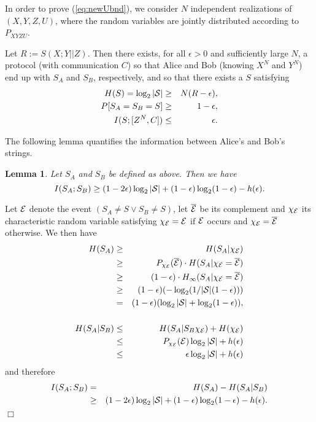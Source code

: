\documentclass[a4paper, twoside, openany]{report}
\newcommand{\eps}{\epsilon}
\newcommand{\ev}{{\cal E}}
\newcommand{\ol}[1]{\overline{#1}}
\theoremstyle{plain}
\newtheorem{lemma}[theorem]{Lemma}
\theoremstyle{definition}
\newcommand{\proofend}{\hspace*{\fill} $\Box$\\}
\begin{document}
In order to prove (\ref{eq:newUbnd}), we consider $N$ independent realizations of $(X,Y,Z,U)$, where the random variables are jointly distributed according to $P_{XYZU}$.

Let $R := S(X;Y||Z)$. Then there exists, for all $\eps > 0$ and sufficiently large $N$, a protocol (with communication $C$) so that Alice and Bob (knowing $X^N$ and $Y^N$) end up with $S_A$ and $S_B$, respectively, and so that there exists a $S$ satisfying
\begin{eqnarray}
H(S) = \log_2|{\cal S}| & \geq & N(R - \eps), \label{rate} \\
P[S_A = S_B = S]        & \geq & 1 - \eps,    \label{identical} \\
I(S;[Z^N,C])            & \leq & \eps.        \label{secret}
\end{eqnarray}

\noindent
The following lemma quantifies the information between Alice's and Bob's strings.

\begin{lemma} \label{iSASB}
Let $S_A$ and $S_B$ be defined as above. Then we have
\[I(S_A;S_B) \geq (1 - 2\eps)\log_2|{\cal S}| + (1 - \eps)\log_2(1 - \eps) - h(\eps).\]
\end{lemma}

\proof
Let $\ev$ denote the event $(S_A \neq S \lor S_B \neq S)$, let $\ol{\ev}$ be its complement and $\chi_{\ev}$ its characteristic random variable satisfying $\chi_{\ev} = \ev$ if $\ev$ occurs and $\chi_{\ev} = \ol{\ev}$ otherwise. We then have
\begin{eqnarray*}
H(S_A) & \geq & H(S_A|\chi_{\ev}) \\
       & \geq & P_{\chi_{\ev}}(\ol{\ev}) \cdot H(S_A|\chi_{\ev} = \ol{\ev}) \\
       & \geq & (1 - \eps) \cdot H_\infty(S_A|\chi_{\ev} = \ol{\ev}) \\
       & \geq & (1 - \eps)(-\log_2(1/|{\cal S}|(1 - \eps))) \\
       &   =  & (1 - \eps)(\log_2|{\cal S}| + \log_2(1 - \eps)), \\ \\
H(S_A|S_B) & \leq & H(S_A|S_B\chi_{\ev}) + H(\chi_{\ev}) \\
           & \leq & P_{\chi_{\ev}}(\ev)\log_2|{\cal S}| + h(\eps) \\
           & \leq & \eps\log_2|{\cal S}| + h(\eps)
\end{eqnarray*}
and therefore
\begin{eqnarray*}
I(S_A;S_B) &   =  & H(S_A) - H(S_A|S_B) \\
           & \geq & (1 - 2\eps)\log_2|{\cal S}| + (1 - \eps)\log_2(1 - \eps) - h(\eps).
\end{eqnarray*}
\proofend
\end{document}
